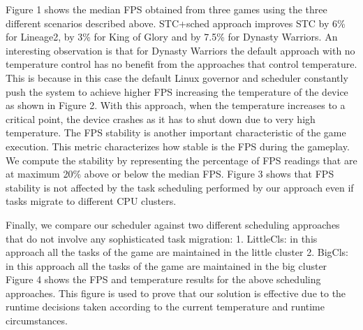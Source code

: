 Figure 1 shows the median FPS obtained from three games using the three different scenarios described above. STC+sched approach improves STC by 6\% for Lineage2, by 3\% for King of Glory and by 7.5\% for Dynasty Warriors. An interesting observation is that for Dynasty Warriors the default approach with no temperature control has no benefit from the approaches that control temperature. This is because in this case the default Linux governor and scheduler constantly push the system to achieve higher FPS increasing the temperature of the device as shown in Figure 2. With this approach, when the temperature increases to a critical point, the device crashes as it has to shut down due to very high temperature.
The FPS stability is another important characteristic of the game execution. This metric characterizes how stable is the FPS during the gameplay. We compute the stability by representing the percentage of FPS readings that are at maximum 20\% above or below the median FPS. Figure 3 shows that FPS stability is not affected by the task scheduling performed by our approach even if tasks migrate to different CPU clusters.

Finally, we compare our scheduler against two different scheduling approaches that do not involve any sophisticated task migration: 
1.	LittleCls: in this approach all the tasks of the game are maintained in the little cluster
2.	BigCls: in this approach all the tasks of the game are maintained in the big cluster
Figure 4 shows the FPS and temperature results for the above scheduling approaches. This figure is used to prove that our solution is effective due to the runtime decisions taken according to the current temperature and runtime circumstances.

